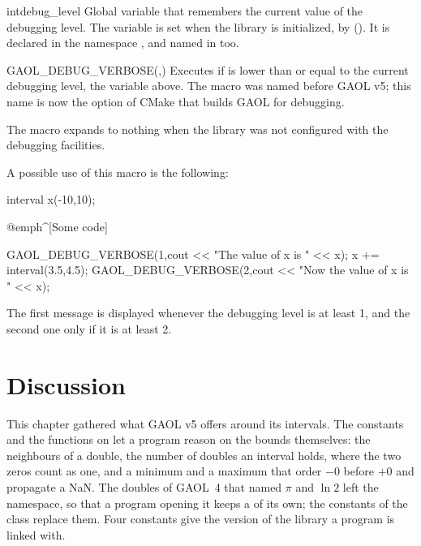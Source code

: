 \documentclass[12pt,a4paper,twoside,openright]{book}
\begin{document}
\begin{deffun}{int}{debug\_level}{}
  Global variable that remembers the current value of the debugging level.
  The variable is set when the library is initialized, by 
  (). It is declared in the namespace ,
  and named in  too.
\end{deffun}

\begin{defmacroA}{GAOL\_DEBUG\_VERBOSE}{(,)}
  Executes  if  is lower than or equal to the current
  debugging level, the variable  above. The macro was
  named  before GAOL v5; this name is now the option of
  CMake that builds GAOL for debugging.\newinvfive

  The macro expands to nothing when the library was not configured with the
  debugging facilities.
\end{defmacroA}

\noindent
A possible use of this macro is the following:

\begin{example}
interval x(-10,10);

@emph^[Some code]~

GAOL_DEBUG_VERBOSE(1,cout << "The value of x is " << x);
x += interval(3.5,4.5);
GAOL_DEBUG_VERBOSE(2,cout << "Now the value of x is " << x);
\end{example}

\noindent
The first message is displayed whenever the debugging level is at least 1,
and the second one only if it is at least 2.

\section{Discussion}\label{sec:errors-discussion}

This chapter gathered what GAOL v5 offers around its intervals. The
constants and the functions on  let a program reason on the
bounds themselves: the neighbours of a double, the number of doubles an
interval holds, where the two zeros count as one, and a minimum and a
maximum that order $-0$ before $+0$ and propagate a NaN. The doubles of
GAOL~4 that named $\pi$ and $\ln 2$ left the namespace, so that a program
opening it keeps a  of its own; the constants of the class
 replace them.\newinvfive{} Four constants give the version
of the library a program is linked with.
\end{document}
